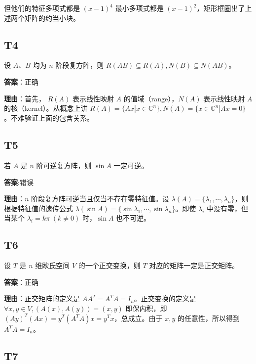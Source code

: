\documentclass{article}
\begin{document}
但他们的特征多项式都是 $(x-1)^4$ 最小多项式都是 $(x-1)^2$，矩形框圈出了上述两个矩阵的约当小块。

\subsection{T4}

\par 设 $A、B$ 均为 $n$ 阶段复方阵，则 $R(AB)\subseteq R(A), N(B)\subseteq N(AB)$。

\par \textbf{答案}：正确

\par \textbf{理由}：首先， $R(A)$ 表示线性映射 $A$ 的值域（range），$N(A)$ 表示线性映射 $A$ 的核（kernel）。从概念上讲 $R(A)=\{Ax | x\in \mathbb C^n\}, N(A)=\{x\in \mathbb C^n|Ax=0\}$。不难验证上面的包含关系。

\subsection{T5}

\par 若 $A$ 是 $n$ 阶可逆复方阵，则 $\sin A$ 一定可逆。

\par \textbf{答案}:错误

\par \textbf{理由}：$n$ 阶段复方阵可逆当且仅当不存在零特征值。设 $\lambda(A)=\{\lambda_1, \cdots, \lambda_n\}$，则根据特征值的遗传公式 $\lambda(\sin A)=\{\sin \lambda_1, \cdots, \sin \lambda_n\}$。即使 $\lambda_i$ 中没有零，但当某个 $\lambda_i=k\pi\;(k\neq 0)$ 时，$\sin A$ 也不可逆。

\subsection{T6}

\par 设 $T$ 是 $n$ 维欧氏空间 $V$ 的一个正交变换，则 $T$ 对应的矩阵一定是正交矩阵。

\par \textbf{答案}：正确

\par \textbf{理由}：正交矩阵的定义是 $AA^T=A^TA=I_n$。正交变换的定义是 $\forall x, y\in V, (A(x), A(y))=(x, y)$ 即保内积，即 $(Ay)^T(Ax)=y^T(A^TA)x=y^Tx$，总成立。由于 $x, y$ 的任意性，所以得到 $A^TA=I_n$。

\subsection{T7}
\end{document}
